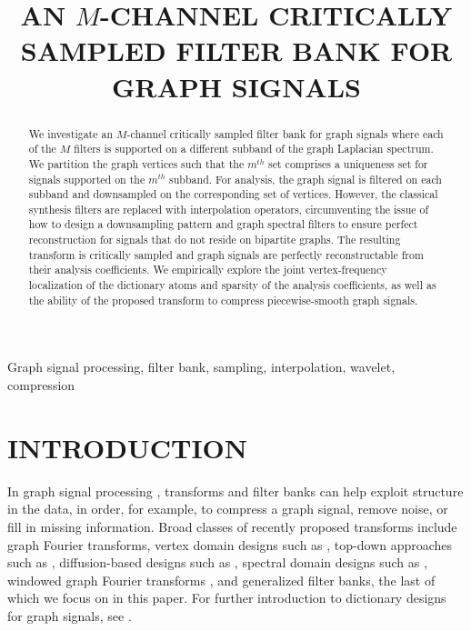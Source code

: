 \documentclass{article}
\title{AN $M$-CHANNEL CRITICALLY SAMPLED FILTER BANK FOR GRAPH SIGNALS}
\begin{document}
%
\maketitle
%
\begin{abstract}
We investigate an $M$-channel critically sampled filter bank for graph signals where each of the $M$ filters is supported on a different subband of the graph Laplacian spectrum. We partition the graph vertices such that the $m^{th}$ set comprises a uniqueness set for signals supported on the $m^{th}$ subband. For analysis, the graph signal is filtered on each subband and downsampled on the corresponding set of vertices. However, the classical synthesis filters are replaced with interpolation operators, circumventing the issue of how to design a downsampling pattern and graph spectral filters to ensure perfect reconstruction for signals that do not reside on bipartite graphs. The resulting transform is critically sampled and graph signals are perfectly reconstructable from their analysis coefficients. We empirically explore the joint vertex-frequency localization of the dictionary atoms and sparsity of the analysis coefficients, as well as the ability of the proposed transform to compress 
piecewise-smooth graph signals. 
\end{abstract}
%
\begin{keywords}
Graph signal processing, filter bank, sampling, interpolation, wavelet, compression
\end{keywords}
%
\section{INTRODUCTION}

In graph signal processing \cite{shuman2013emerging}, transforms and filter banks can help exploit structure in the data, in order, for example, to compress a graph signal, remove noise, or fill in missing information. 
Broad classes of recently proposed transforms include graph Fourier transforms, vertex domain designs such as \cite{Crovella2003,wang}, top-down approaches such as \cite{szlam,gavish,irion}, diffusion-based designs such as \cite{coifman2006diffusion,Maggioni_biorthogonal}, spectral domain designs such as \cite{hammond2011wavelets,shuman2013spectrum}, windowed graph Fourier transforms  \cite{shuman2015vertex}, and generalized filter banks, the last of which we focus on in this paper. For further introduction to dictionary designs for graph signals, see \cite{shuman2013emerging}.
\end{document}
